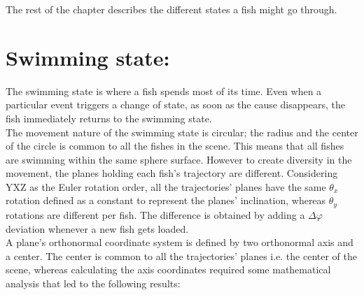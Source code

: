 The rest of the chapter describes the different states a fish might go through.

\section{Swimming state:}
\label{subsec:swimmingstate}

The swimming state is where a fish spends most of its time. Even when a particular event triggers a change of state, as soon as the cause disappears, the fish immediately returns to the swimming state.\\

The movement nature of the swimming state is circular; the radius and the center of the circle is common to all the fishes in the scene. This means that all fishes are swimming within the same sphere surface. However to create diversity in the movement, the planes holding each fish's trajectory are different. Considering YXZ as the Euler rotation order, all the trajectories' planes have the same $\theta _{x}$ rotation defined as a constant to represent the planes' inclination, whereas $\theta _{y}$ rotations are different per fish. The difference is obtained by adding a $\Delta \varphi$ deviation whenever a new fish gets loaded.\\

A plane's orthonormal coordinate system is defined by two orthonormal axis and a center. The center is common to all the trajectories' planes i.e. the center of the scene, whereas calculating the axis coordinates required some mathematical analysis that led to the following results:\\

